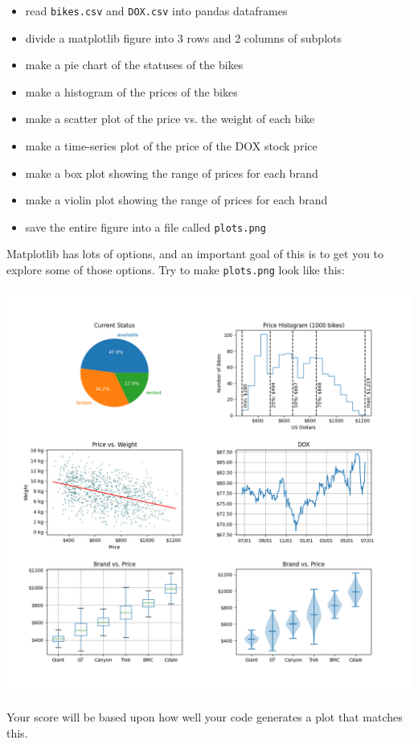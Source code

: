 \documentclass[11pt,english]{article}
\begin{document}
\begin{itemize}
\item read \texttt{bikes.csv} and \texttt{DOX.csv} into pandas dataframes
\item divide a matplotlib figure into 3 rows and 2 columns of subplots
\item make a pie chart of the statuses of the bikes
\item make a histogram of the prices of the bikes
\item make a scatter plot of the price vs. the weight of each bike
\item make a time-series plot of the price of the DOX stock price
\item make a box plot showing the range of prices for each brand
\item make a violin plot showing the range of prices for each brand
\item save the entire figure into a file called \texttt{plots.png}
\end{itemize}

Matplotlib has lots of options,  and an important goal of this is to get you to explore some of those options.   Try to make \texttt{plots.png} look like this:

\includegraphics[width=\textwidth]{target.png}

Your score will be based upon how well your code generates a plot that matches this.
\end{document}
